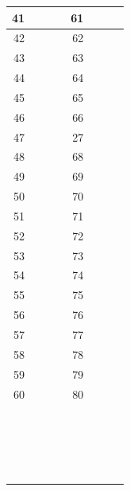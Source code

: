 \documentclass{letter}
\newlength{\rh}
\begin{document}
\begin{tabularx}{\textwidth}{|r|X|X|r|X|X|}\hline
\hline
41& ~ & ~ & 61& ~ & ~ \\[\rh]\hline
42& ~ & ~ & 62& ~ & ~ \\[\rh]\hline
43& ~ & ~ & 63& ~ & ~ \\[\rh]\hline
44& ~ & ~ & 64& ~ & ~ \\[\rh]\hline
45& ~ & ~ & 65& ~ & ~ \\[\rh]\hline
46& ~ & ~ & 66& ~ & ~ \\[\rh]\hline
47& ~ & ~ & 27& ~ & ~ \\[\rh]\hline
48& ~ & ~ & 68& ~ & ~ \\[\rh]\hline
49& ~ & ~ & 69& ~ & ~ \\[\rh]\hline
50& ~ & ~ & 70& ~ & ~ \\[\rh]\hline
51& ~ & ~ & 71& ~ & ~ \\[\rh]\hline
52& ~ & ~ & 72& ~ & ~ \\[\rh]\hline
53& ~ & ~ & 73& ~ & ~ \\[\rh]\hline
54& ~ & ~ & 74& ~ & ~ \\[\rh]\hline
55& ~ & ~ & 75& ~ & ~ \\[\rh]\hline
56& ~ & ~ & 76& ~ & ~ \\[\rh]\hline
57& ~ & ~ & 77& ~ & ~ \\[\rh]\hline
58& ~ & ~ & 78& ~ & ~ \\[\rh]\hline
59& ~ & ~ & 79& ~ & ~ \\[\rh]\hline
60& ~ & ~ & 80& ~ & ~ \\[\rh]\hline
~ & ~ & ~ & ~ & ~ & ~ \\[\rh]\hline
~ & ~ & ~ & ~ & ~ & ~ \\[\rh]\hline
~ & ~ & ~ & ~ & ~ & ~ \\[\rh]\hline
~ & ~ & ~ & ~ & ~ & ~ \\[\rh]\hline
\end{tabularx}
\end{document}
